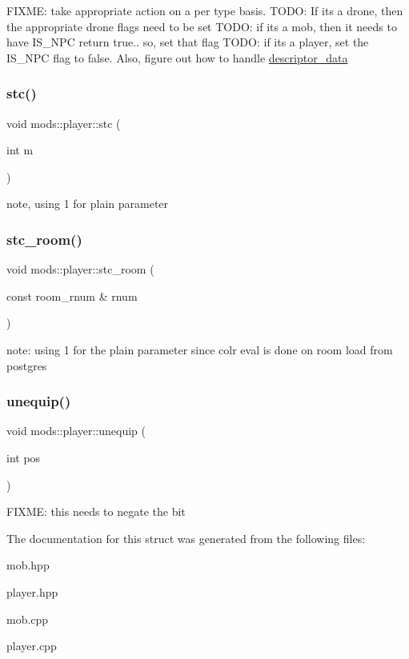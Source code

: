 F\+I\+X\+ME\+: take appropriate action on a per type basis. T\+O\+DO\+: If it\textquotesingle{}s a drone, then the appropriate drone flags need to be set T\+O\+DO\+: if it\textquotesingle{}s a mob, then it needs to have I\+S\+\_\+\+N\+PC return true.. so, set that flag T\+O\+DO\+: if it\textquotesingle{}s a player, set the I\+S\+\_\+\+N\+PC flag to false. Also, figure out how to handle \hyperlink{structmods_1_1descriptor__data}{descriptor\+\_\+data}\mbox{\label{classmods_1_1player_a3d00ca11aeb86fa14ed502a661b84d9a}} 
\subsubsection{\texorpdfstring{stc()}{stc()}}
{\footnotesize\ttfamily void mods\+::player\+::stc (\begin{DoxyParamCaption}\item[{int}]{m }\end{DoxyParamCaption})}

note, using 1 for plain parameter \mbox{\label{classmods_1_1player_a05030c2c9439f95c84704ed6f7c993d1}} 
\subsubsection{\texorpdfstring{stc\+\_\+room()}{stc\_room()}}
{\footnotesize\ttfamily void mods\+::player\+::stc\+\_\+room (\begin{DoxyParamCaption}\item[{const room\+\_\+rnum \&}]{rnum }\end{DoxyParamCaption})}

note\+: using 1 for the plain parameter since colr eval is done on room load from postgres \mbox{\label{classmods_1_1player_a7fd5d35771a57dfe6c8ec7e1199873ab}} 
\subsubsection{\texorpdfstring{unequip()}{unequip()}}
{\footnotesize\ttfamily void mods\+::player\+::unequip (\begin{DoxyParamCaption}\item[{int}]{pos }\end{DoxyParamCaption})}

F\+I\+X\+ME\+: this needs to negate the bit 

The documentation for this struct was generated from the following files\+:\begin{DoxyCompactItemize}
\item 
mob.\+hpp\item 
player.\+hpp\item 
mob.\+cpp\item 
player.\+cpp\end{DoxyCompactItemize}
